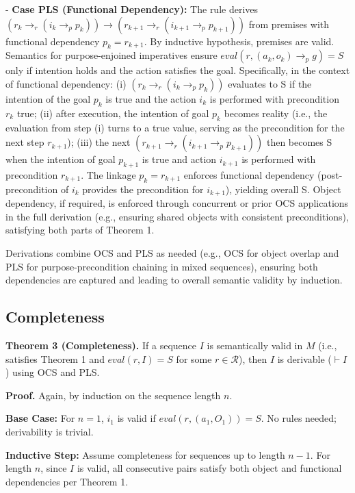 \documentclass[a4paper,11pt]{lmcs}
\begin{document}
- \textbf{Case PLS (Functional Dependency):} The rule derives \( (r_k \rightarrow_r (i_k \rightarrow_p p_k)) \rightarrow (r_{k+1} \rightarrow_r (i_{k+1} \rightarrow_p p_{k+1})) \) from premises with functional dependency \( p_k = r_{k+1} \). By inductive hypothesis, premises are valid. Semantics for purpose-enjoined imperatives ensure \( \textit{eval}(r, (a_k, o_k) \rightarrow_p g) = S \) only if intention holds and the action satisfies the goal. Specifically, in the context of functional dependency: (i) \( (r_k \rightarrow_r (i_k \rightarrow_p p_k)) \) evaluates to S if the intention of the goal \( p_k \) is true and the action \( i_k \) is performed with precondition \( r_k \) true; (ii) after execution, the intention of goal \( p_k \) becomes reality (i.e., the evaluation from step (i) turns to a true value, serving as the precondition for the next step \( r_{k+1} \)); (iii) the next \( (r_{k+1} \rightarrow_r (i_{k+1} \rightarrow_p p_{k+1})) \) then becomes S when the intention of goal \( p_{k+1} \) is true and action \( i_{k+1} \) is performed with precondition \( r_{k+1} \). The linkage \( p_k = r_{k+1} \) enforces functional dependency (post-precondition of \( i_k \) provides the precondition for \( i_{k+1} \)), yielding overall S. Object dependency, if required, is enforced through concurrent or prior OCS applications in the full derivation (e.g., ensuring shared objects with consistent preconditions), satisfying both parts of Theorem 1.

Derivations combine OCS and PLS as needed (e.g., OCS for object overlap and PLS for purpose-precondition chaining in mixed sequences), ensuring both dependencies are captured and leading to overall semantic validity by induction.

\subsection{Completeness}

\textbf{Theorem 3 (Completeness).} If a sequence \( I \) is semantically valid in \( M \) (i.e., satisfies Theorem 1 and \( \textit{eval}(r, I) = S \) for some \( r \in \mathcal{R} \)), then \( I \) is derivable (\( \vdash I \)) using OCS and PLS.

\textbf{Proof.} Again, by induction on the sequence length \( n \).

\textbf{Base Case:} For \( n=1 \), \( i_1 \) is valid if \( \textit{eval}(r, (a_1, O_1)) = S \). No rules needed; derivability is trivial.

\textbf{Inductive Step:} Assume completeness for sequences up to length \( n-1 \). For length \( n \), since \( I \) is valid, all consecutive pairs satisfy both object and functional dependencies per Theorem 1.
\end{document}
